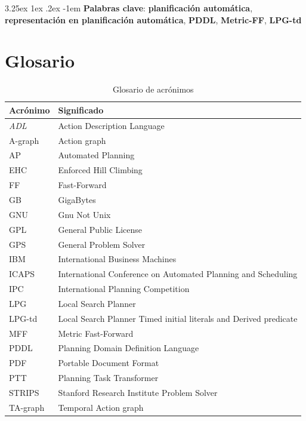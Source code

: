 \documentclass{article}
\makeatletter
\renewcommand\paragraph{\@startsection{paragraph}{5}{\z@}%
      {3.25ex \@plus1ex \@minus.2ex}%
      {-1em}%
      {\normalfont\normalsize\bfseries}}
\makeatother
\begin{document}
    \paragraph{}
    \textbf{Palabras clave}: \textbf{planificación automática}, \textbf{representación en planificación automática}, \textbf{PDDL}, \textbf{Metric-FF}, \textbf{LPG-td}
    
    
    \clearpage\null\newpage
    
    \section{Glosario}
    \begin{table}[H]
      \centering
      \caption{Glosario de acrónimos}
      \label{tab:table1}
      \begin{tabular}{ll}
        \toprule
        Acrónimo & Significado\\
        \midrule
        \textit{ADL} & Action Description Language \\
        A-graph & Action graph \\
        AP & Automated Planning \\
        EHC & Enforced Hill Climbing \\
        FF & Fast-Forward \\
        GB & GigaBytes \\
        GNU & Gnu Not Unix \\   
        GPL & General Public License \\
        GPS & General Problem Solver \\
        IBM & International Business Machines \\
        ICAPS & International Conference on Automated Planning and Scheduling \\
        IPC & International Planning Competition \\
        LPG & Local Search Planner \\
        LPG-td & Local Search Planner Timed initial literals and Derived predicate \\
        MFF & Metric Fast-Forward \\
        PDDL & Planning Domain Definition Language \\
        PDF & Portable Document Format \\
        PTT & Planning Task Transformer \\
        STRIPS & Stanford Research Institute Problem Solver \\
        TA-graph & Temporal Action graph \\
        \bottomrule
      \end{tabular}
    \end{table}
    
\end{document}
